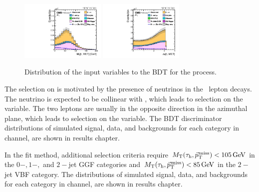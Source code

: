 \begin{figure}[htbp!]
  \includegraphics[width=0.36\textwidth]{plots/chapter6/mutau/MTTauMET.pdf}
  \includegraphics[width=0.36\textwidth]{plots/chapter6/mutau/dPhiTauMET.pdf}\\
  \caption{Distribution of the input variables to the BDT for the \Hmuhad process.}
  \label{fig:input_mt}
\end{figure}

The selection on \ptvecmiss is motivated by the presence of neutrinos in the \Pgt\, lepton decays. The neutrino is expected to be collinear with \tauh, which leads to selection on the \dphitauhmet variable. The two leptons are usually in the opposite direction in the azimuthal plane, which leads to selection on the \dphimtauh variable. The BDT discriminator distributions of simulated signal, data, and backgrounds for each category in \Hmuhad channel, are shown in results chapter.

In the \mcol fit method, additional selection criteria require $M_\mathrm{T}(\tau_{\text{h}}, {\vec p}_{\mathrm{T}}^{\kern1pt\text{miss}}) < 105\,\text{Ge\hspace{-.08em}V}$ in the $0-, 1-,$ and $2-$jet GGF categories and $M_\mathrm{T}(\tau_{\text{h}}, {\vec p}_{\mathrm{T}}^{\kern1pt\text{miss}}) < 85\,\text{Ge\hspace{-.08em}V}$ in the $2-$jet VBF category. The \mcol distributions of simulated signal, data, and backgrounds for each category in \Hmuhad channel, are shown in results chapter.

